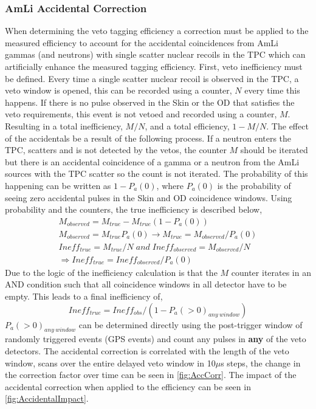 \subsubsection{AmLi Accidental Correction}\label{sec:AmLiAccCorrection}
When determining the veto tagging efficiency a correction must be applied to the measured efficiency to account for the accidental coincidences from AmLi gammas (and neutrons) with single scatter nuclear recoils in the TPC which can artificially enhance the measured tagging efficiency.
First, veto inefficiency must be defined. Every time a single scatter nuclear recoil is observed in the TPC, a veto window is opened, this can be recorded using a counter, $N$ every time this happens. 
If there is no pulse observed in the Skin or the OD that satisfies the veto requirements, this event is not vetoed and recorded using a counter, $M$. Resulting in a total inefficiency, $M/N$, and a total efficiency, $1-M/N$.
The effect of the accidentals be a result of the following process. 
If a neutron enters the TPC, scatters and is not detected by the vetos, the counter $M$ should be iterated but there is an accidental coincidence of a gamma or a neutron from the AmLi sources with the TPC scatter so the count is not iterated. 
The probability of this happening can be written as $1-P_a(0)$, where $P_a(0)$ is the probability of seeing zero accidental pulses in the Skin and OD coincidence windows. 
Using probability and the counters, the true inefficiency is described below,
\begin{gather*}
    M_{observed}=M_{true}-M_{true}(1-P_a(0)) \\
    M_{observed}=M_{true}P_a(0)\rightarrow M_{true}=M_{observed}/P_a(0)\\
    Ineff_{true}=M_{true}/N\;and\;Ineff_{observed}=M_{observed}/N\\
    \Rightarrow Ineff_{true}=Ineff_{observed}/P_a(0)
\end{gather*}
Due to the logic of the inefficiency calculation is that the $M$ counter iterates in an AND condition such that all coincidence windows in all detector have to be empty. 
This leads to a final inefficiency of,
\begin{equation}
    Ineff_{true} = Ineff_{obs}  / (1 - P_a(>0)_{any\:window})
\end{equation}
$P_a(>0)_{any\:window}$ can be determined directly using the post-trigger window of randomly triggered events (GPS events) and count any pulses in \textbf{any} of the veto detectors. 
The accidental correction is correlated with the length of the veto window, scans over the entire delayed veto window in 10$\mu$s steps, the change in the correction factor over time can be seen in \autoref{fig:AccCorr}.
The impact of the accidental correction when applied to the efficiency can be seen in \autoref{fig:AccidentalImpact}.

